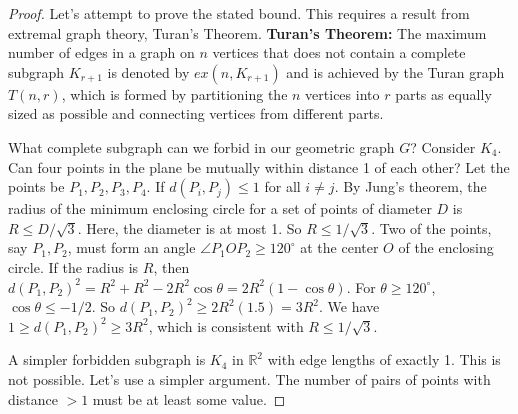 \begin{enumerate}
\begin{proof}
    Let's attempt to prove the stated bound. This requires a result from extremal graph theory, Turan's Theorem.
    \textbf{Turan's Theorem:} The maximum number of edges in a graph on $n$ vertices that does not contain a complete subgraph $K_{r+1}$ is denoted by $ex(n, K_{r+1})$ and is achieved by the Turan graph $T(n,r)$, which is formed by partitioning the $n$ vertices into $r$ parts as equally sized as possible and connecting vertices from different parts.
    
    What complete subgraph can we forbid in our geometric graph $G$?
    Consider $K_4$. Can four points in the plane be mutually within distance 1 of each other? Let the points be $P_1, P_2, P_3, P_4$. If $d(P_i, P_j) \le 1$ for all $i \neq j$. By Jung's theorem, the radius of the minimum enclosing circle for a set of points of diameter $D$ is $R \le D/\sqrt{3}$. Here, the diameter is at most 1. So $R \le 1/\sqrt{3}$. Two of the points, say $P_1, P_2$, must form an angle $\angle P_1 O P_2 \ge 120^\circ$ at the center $O$ of the enclosing circle. If the radius is $R$, then $d(P_1,P_2)^2 = R^2+R^2 - 2R^2\cos\theta = 2R^2(1-\cos\theta)$. For $\theta \ge 120^\circ$, $\cos\theta \le -1/2$. So $d(P_1,P_2)^2 \ge 2R^2(1.5) = 3R^2$. We have $1 \ge d(P_1,P_2)^2 \ge 3R^2$, which is consistent with $R \le 1/\sqrt{3}$.
    
    A simpler forbidden subgraph is $K_4$ in $\mathbb{R}^2$ with edge lengths of exactly 1. This is not possible.
    Let's use a simpler argument. The number of pairs of points with distance $>1$ must be at least some value.
    

\end{proof}
\end{enumerate}
